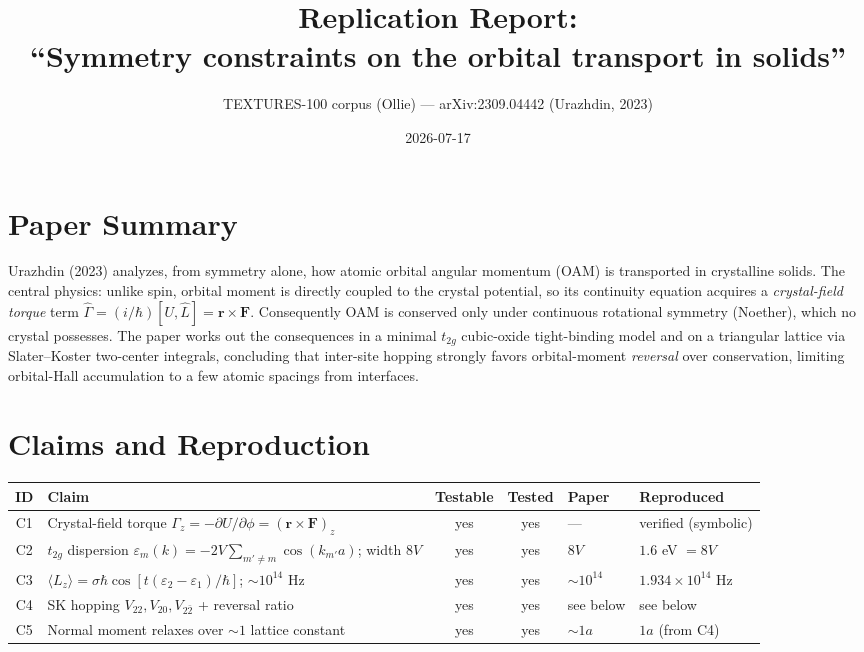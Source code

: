 \documentclass[11pt]{article}
\title{Replication Report: \\ ``Symmetry constraints on the orbital transport in solids''}
\author{TEXTURES-100 corpus (Ollie) --- arXiv:2309.04442 (Urazhdin, 2023)}
\date{2026-07-17}
\begin{document}
\maketitle

\section{Paper Summary}
Urazhdin (2023) analyzes, from symmetry alone, how atomic orbital angular momentum (OAM)
is transported in crystalline solids. The central physics: unlike spin, orbital moment is
directly coupled to the crystal potential, so its continuity equation acquires a
\emph{crystal-field torque} term $\hat{\Gamma} = (i/\hbar)[U,\hat{L}] = \mathbf{r}\times\mathbf{F}$.
Consequently OAM is conserved only under continuous rotational symmetry (Noether), which no
crystal possesses. The paper works out the consequences in a minimal $t_{2g}$ cubic-oxide
tight-binding model and on a triangular lattice via Slater--Koster two-center integrals,
concluding that inter-site hopping strongly favors orbital-moment \emph{reversal} over
conservation, limiting orbital-Hall accumulation to a few atomic spacings from interfaces.

\section{Claims and Reproduction}
\begin{table}[h]\centering\small
\begin{tabular}{clccll}
\toprule
ID & Claim & Testable & Tested & Paper & Reproduced \\
\midrule
C1 & Crystal-field torque $\Gamma_z=-\partial U/\partial\phi=(\mathbf{r}\times\mathbf{F})_z$ & yes & yes & --- & verified (symbolic) \\
C2 & $t_{2g}$ dispersion $\varepsilon_m(k)=-2V\sum_{m'\neq m}\cos(k_{m'}a)$; width $8V$ & yes & yes & $8V$ & $1.6$ eV $=8V$ \\
C3 & $\langle L_z\rangle=\sigma\hbar\cos[t(\varepsilon_2-\varepsilon_1)/\hbar]$; $\sim10^{14}$ Hz & yes & yes & $\sim10^{14}$ & $1.934\times10^{14}$ Hz \\
C4 & SK hopping $V_{22},V_{20},V_{2\bar2}$ + reversal ratio & yes & yes & see below & see below \\
C5 & Normal moment relaxes over $\sim1$ lattice constant & yes & yes & $\sim 1a$ & $1a$ (from C4) \\
\bottomrule
\end{tabular}
\end{table}
\end{document}
